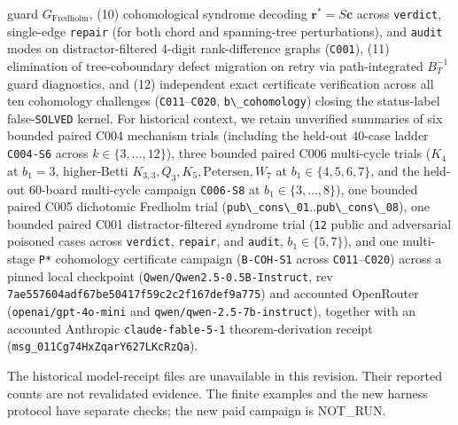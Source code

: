 \documentclass[
  11pt,
]{article}
\newcommand{\passthrough}[1]{#1}
\begin{document}
guard \(G_{\text{Fredholm}}\), (10) cohomological syndrome decoding
\(\mathbf{r}^* = S\mathbf{c}\) across \passthrough{\lstinline!verdict!},
single-edge \passthrough{\lstinline!repair!} (for both chord and
spanning-tree perturbations), and \passthrough{\lstinline!audit!} modes
on distractor-filtered 4-digit rank-difference graphs
(\passthrough{\lstinline!C001!}), (11) elimination of tree-coboundary
defect migration on retry via path-integrated \(B_T^{-1}\) guard
diagnostics, and (12) independent exact certificate verification across
all ten cohomology challenges
(\passthrough{\lstinline!C011!}--\passthrough{\lstinline!C020!},
\passthrough{\lstinline!b\_cohomology!}) closing the status-label
false-\passthrough{\lstinline!SOLVED!} kernel. For historical context,
we retain unverified summaries of six bounded paired C004 mechanism
trials (including the held-out 40-case ladder
\passthrough{\lstinline!C004-S6!} across
\(k \in \{3,\allowbreak  \dots,\allowbreak  12\}\)), three bounded
paired C006 multi-cycle trials (\(K_4\) at \(b_1 = 3\), higher-Betti
\(K_{3,\allowbreak 3},\allowbreak  Q_3,\allowbreak  K_5,\allowbreak  \text{Petersen},\allowbreak  W_7\)
at \(b_1 \in \{4,\allowbreak  5,\allowbreak  6,\allowbreak  7\}\), and
the held-out 60-board multi-cycle campaign
\passthrough{\lstinline!C006-S8!} at
\(b_1 \in \{3,\allowbreak  \dots,\allowbreak  8\}\)), one bounded paired
C005 dichotomic Fredholm trial
(\passthrough{\lstinline!pub\_cons\_01!}..\passthrough{\lstinline!pub\_cons\_08!}),
one bounded paired C001 distractor-filtered syndrome trial
(\passthrough{\lstinline!12!} public and adversarial poisoned cases
across \passthrough{\lstinline!verdict!},
\passthrough{\lstinline!repair!}, and \passthrough{\lstinline!audit!},
\(b_1 \in \{5,\allowbreak  7\}\)), and one multi-stage
\passthrough{\lstinline!P*!} cohomology certificate campaign
(\passthrough{\lstinline!B-COH-S1!} across
\passthrough{\lstinline!C011!}--\passthrough{\lstinline!C020!}) across a
pinned local checkpoint (\nolinkurl{Qwen/Qwen2.5-0.5B-Instruct}, rev
\nolinkurl{7ae557604adf67be50417f59c2c2f167def9a775}) and accounted
OpenRouter (\nolinkurl{openai/gpt-4o-mini} and
\nolinkurl{qwen/qwen-2.5-7b-instruct}), together with an accounted
Anthropic \nolinkurl{claude-fable-5-1} theorem-derivation receipt
(\nolinkurl{msg_011Cg74HxZqarY627LKcRzQa}).

The historical model-receipt files are unavailable in this revision.
Their reported counts are not revalidated evidence. The finite examples
and the new harness protocol have separate checks; the new paid campaign
is NOT\_RUN.
\end{document}
